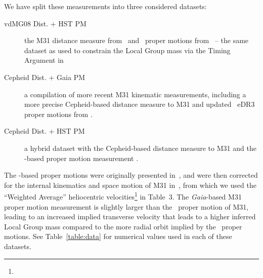 \documentclass[twocolumn]{aastex631}
\begin{document}
We have split these measurements into three considered datasets: 
\begin{description}
  \item[vdMG08 Dist. + HST PM] the 
  M31 distance measure from~\cite{vdm2008} and \hst\ proper motions 
  from~\citet{vdm2012} -- the same dataset as used to constrain the Local Group
  mass via the Timing Argument 
  in~\citet{vdm2012}
  \item[Cepheid Dist. + Gaia PM]  a
  compilation of more recent M31 kinematic measurements, including a more
  precise Cepheid-based distance measure to M31 \citep{Li2021} and updated
  \gaia\ eDR3 proper motions from \citep{Salomon2021}. 
  \item[Cepheid Dist. + HST PM] a hybrid dataset with the Cepheid-based distance 
  measure to M31 and the \hst-based proper motion measurement 
  \citep{Li2021,vdm2012}.
\end{description}
The \hst-based proper motions were originally presented in~\cite{Sohn:2012}, 
and were then corrected for the internal kinematics and space motion of 
M31 in~\cite{vdm2012},
from which we used the ``Weighted Average'' heliocentric 
velocities\footnote{}
in Table~3.
The \textit{Gaia}-based M31 proper motion measurement is
slightly larger than the \hst\ proper motion of M31, leading to an increased
implied transverse velocity that leads to a higher inferred Local Group mass
compared to the more radial orbit implied by the \hst\ proper motions.
See Table~\ref{table:data} for numerical values used in each of these datasets.
\end{document}
